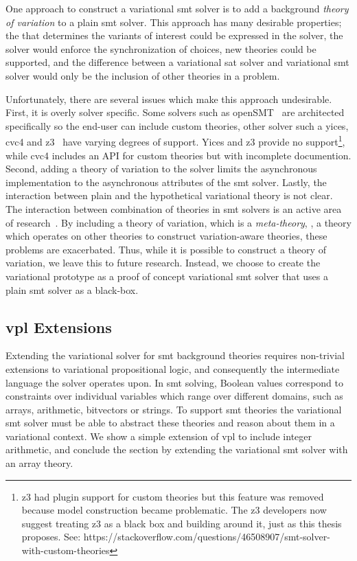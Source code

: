 One approach to construct a variational \ac{smt} solver is to add a background
\emph{theory of variation} to a plain \ac{smt} solver. This approach has many
desirable properties; the \vc{} that determines the variants of interest could
be expressed in the solver, the solver would enforce the synchronization of
choices, new theories could be supported, and the difference between a
variational \ac{sat} solver and variational \ac{smt} solver would only be the
inclusion of other theories in a problem.

Unfortunately, there are several issues which make this approach undesirable.
First, it is overly solver specific. Some solvers such as openSMT~\cite{openSMT}
are architected specifically so the end-user can include custom theories, other
solver such a yices\cite{10.1007/978-3-319-08867-9_49},
cvc4\cite{10.1007/978-3-642-22110-1_14} and
z3~\cite{10.1007/978-3-540-78800-3_24} have varying degrees of support. Yices
and z3 provide no support\footnote{z3 had plugin support for custom theories but
  this feature was removed because model construction became problematic. The z3
  developers now suggest treating z3 as a black box and building around it, just
  as this thesis proposes. See:
  https://stackoverflow.com/questions/46508907/smt-solver-with-custom-theories},
while cvc4 includes an API for custom theories but with incomplete documention.
Second, adding a theory of variation to the solver limits the asynchronous
implementation to the asynchronous attributes of the \ac{smt} solver. Lastly,
the interaction between plain and the hypothetical variational theory is not
clear. The interaction between combination of theories in \ac{smt} solvers is an
active area of research~\cite{10.5555/1550723}. By including a theory of
variation, which is a \emph{meta-theory}, \ie{}, a theory which operates on
other theories to construct variation-aware theories, these problems are
exacerbated. Thus, while it is possible to construct a theory of variation, we
leave this to future research. Instead, we choose to create the variational
prototype as a proof of concept variational \ac{smt} solver that uses a plain
\ac{smt} solver as a black-box.


\subsection{\ac{vpl} Extensions}
Extending the variational solver for \ac{smt} background theories requires
non-trivial extensions to variational propositional logic, and consequently the
intermediate language the solver operates upon. In \ac{smt} solving, Boolean
values correspond to constraints over individual variables which range over
different domains, such as arrays, arithmetic, bitvectors or strings. To support
\ac{smt} theories the variational \ac{smt} solver must be able to abstract these
theories and reason about them in a variational context. We show a simple
extension of \ac{vpl} to include integer arithmetic, and conclude the section by
extending the variational \ac{smt} solver with an array theory.

